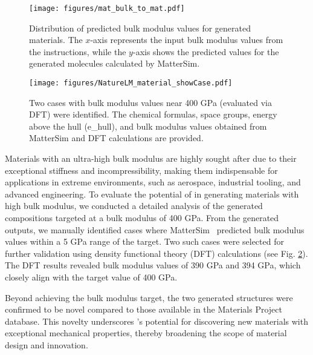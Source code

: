 \begin{figure}[!htbp]
    \centering
    \texttt{[image: figures/mat\_bulk\_to\_mat.pdf]}
    \caption{Distribution of predicted bulk modulus values for generated materials. The $x$-axis represents the input bulk modulus values from the instructions, while the $y$-axis shows the predicted values for the generated molecules calculated by MatterSim. }
    \label{fig:mat_bulk_to_mat}
\end{figure}

\begin{figure}[!htbp]
    \centering
    \texttt{[image: figures/NatureLM\_material\_showCase.pdf]}
    \caption{Two cases with bulk modulus values near 400 GPa (evaluated via DFT) were identified. The chemical formulas, space groups, energy above the hull (e\_hull), and bulk modulus values obtained from MatterSim and DFT calculations are provided.}
    \label{fig:bulk_caseStudy}
\end{figure}

Materials with an ultra-high bulk modulus are highly sought after due to their exceptional stiffness and incompressibility, making them indispensable for applications in extreme environments, such as aerospace, industrial tooling, and advanced engineering. To evaluate the potential of \ourM{} in generating materials with high bulk modulus, we conducted a detailed analysis of the generated compositions targeted at a bulk modulus of 400 GPa. From the generated outputs, we manually identified cases where MatterSim~\cite{yang2024mattersim} predicted bulk modulus values within a 5 GPa range of the target. Two such cases were selected for further validation using density functional theory (DFT) calculations (see Fig. \ref{fig:bulk_caseStudy}). The DFT results revealed bulk modulus values of 390 GPa and 394 GPa, which closely align with the target value of 400 GPa. 

Beyond achieving the bulk modulus target, the two generated structures were confirmed to be novel compared to those available in the Materials Project database. This novelty underscores \ourM{}'s potential for discovering new materials with exceptional mechanical properties, thereby broadening the scope of material design and innovation.



